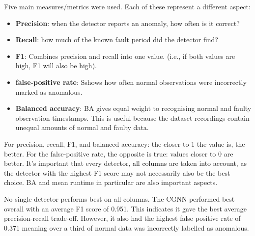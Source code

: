 Five main measures/metrics were used. Each of these represent a different aspect:
\begin{itemize}
    \item \textbf{Precision}: when the detector reports an anomaly, how often is it correct?
    \item \textbf{Recall}: how much of the known fault period did the detector find?
    \item \textbf{F1}: Combines precision and recall into one value. (i.e., if both values are high, F1 will also be high).
    \item \textbf{false-positive rate}: Sshows how often normal observations were incorrectly marked as anomalous.
    \item \textbf{Balanced accuracy}: BA gives equal weight to recognising normal and faulty observation timestamps. This is useful because the dataset-recordings contain unequal amounts of normal and faulty data.
\end{itemize}

For precision, recall, F1, and balanced accuracy: the closer to 1 the value is, the better. For the false-positive rate, the opposite is true: values closer to 0 are better. It's important that every detector, all columns are taken into account, as the detector with the highest F1 score may not necessarily also be the best choice. BA and mean runtime in particular are also important aspects.

\begin{table}[H]
    \centering
    \scriptsize
    \caption{Mean results for the five held-out temporal tests.}
    \label{tab:h9-rcaeval-calibrated-results}
\end{table}

No single detector performs best on all columns. The CGNN performed best overall with an average F1 score of 0.951. This indicates it gave the best average precision-recall trade-off. However, it also had the highest false positive rate of 0.371 meaning over a third of normal data was incorrectly labelled as anomalous.

